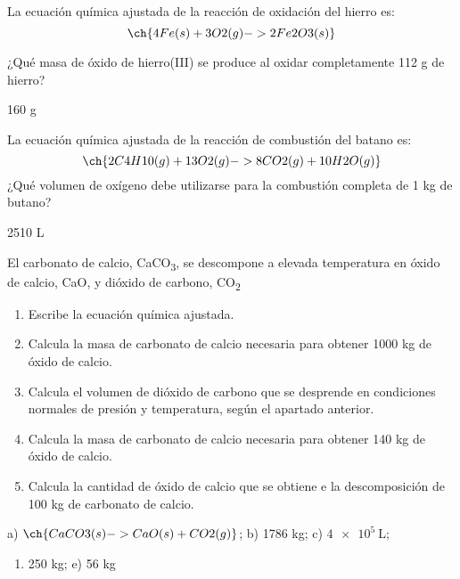 \documentclass[
]{article}
\providecommand{\tightlist}{%
  \setlength{\itemsep}{0pt}\setlength{\parskip}{0pt}}
\begin{document}
\begin{exercise}La ecuación química ajustada de la reacción de oxidación
del hierro es: \[\ch{4 Fe(s) + 3 O2(g) -> 2 Fe2O3(s)}\]

¿Qué masa de óxido de hierro(III) se produce al oxidar completamente 112
g de hierro?\end{exercise}

\begin{solution}160 g\end{solution}

\begin{exercise}La ecuación química ajustada de la reacción de
combustión del batano es:
\[\ch{2 C4H10(g) + 13 O2(g) -> 8 CO2(g) + 10 H2O(g)}\] ¿Qué volumen de
oxígeno debe utilizarse para la combustión completa de 1 kg de
butano?\end{exercise}

\begin{solution}2510 L\end{solution}

\begin{exercise}El carbonato de calcio, CaCO\textsubscript{3}, se
descompone a elevada temperatura en óxido de calcio, CaO, y dióxido de
carbono, CO\textsubscript{2}

\begin{enumerate}
\def\labelenumi{\alph{enumi})}
\tightlist
\item
  Escribe la ecuación química ajustada.
\item
  Calcula la masa de carbonato de calcio necesaria para obtener 1000 kg
  de óxido de calcio.
\item
  Calcula el volumen de dióxido de carbono que se desprende en
  condiciones normales de presión y temperatura, según el apartado
  anterior.
\item
  Calcula la masa de carbonato de calcio necesaria para obtener 140 kg
  de óxido de calcio.
\item
  Calcula la cantidad de óxido de calcio que se obtiene e la
  descomposición de 100 kg de carbonato de calcio.
\end{enumerate}

\end{exercise}

\begin{solution}a) \(\ch{CaCO3(s) -> CaO(s) + CO2(g)}\); b) 1786 kg; c)
\(\SI{4e5}{\L}\);

\begin{enumerate}
\def\labelenumi{\alph{enumi})}
\setcounter{enumi}{3}
\tightlist
\item
  250 kg; e) 56 kg
\end{enumerate}

\end{solution}
\end{document}
